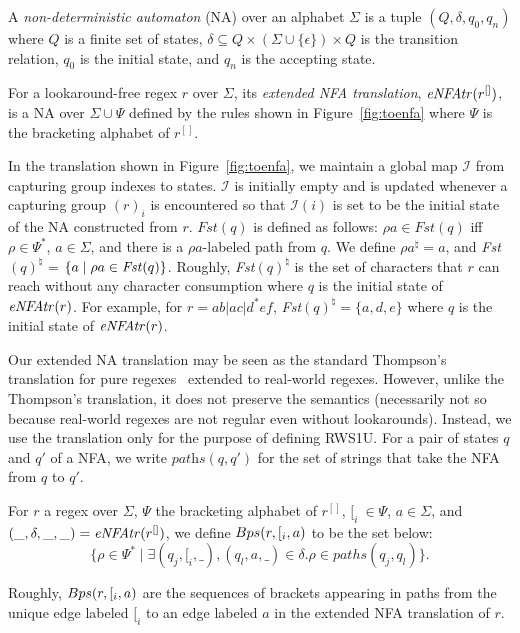 \documentclass[conference]{IEEEtran}
\newcommand{\computePath}{{\sc Bps}}
\newcommand{\follow}{\textit{Fst}}
\newcommand{\Bracketing}{\Psi}
\newcommand{\toENFA}{{\it eNFAtr}}
\newcommand{\ltp}{RWS1U}
\begin{document}
A {\em non-deterministic automaton} ({NA}) over an alphabet $\Sigma$ is a tuple $(Q, \delta, q_0, q_n)$ where $Q$ is a finite set of states, $\delta \subseteq Q \times (\Sigma\cup\{ \epsilon \}) \times Q$ is the transition relation, $q_0$ is the initial state, and $q_n$ is the accepting state. 
\begin{definition}[$\toENFA$]
\label{def:toenfa}
\normalfont
For a lookaround-free regex $r$ over $\Sigma$, its {\em extended NFA translation}, $\toENFA(r^{[]})$, is a {NA} over $\Sigma \cup \Bracketing$ defined by the rules shown in Figure~\ref{fig:toenfa} where $\Bracketing$ is the bracketing alphabet of $r^{[]}$.
\end{definition}
In the translation shown in Figure~\ref{fig:toenfa}, we maintain a global map $\mathcal{I}$ from capturing group indexes to states.  $\mathcal{I}$ is initially empty and is updated whenever a capturing group $(r)_i$ is encountered so that $\mathcal{I}(i)$ is set to be the initial state of the {NA} constructed from $r$.  
$\follow(q)$ is defined as follows: $\rho a \in \follow(q)$ iff $\rho \in \Bracketing^*$, $a \in \Sigma$, and there is a $\rho a$-labeled path from $q$.  We define $\rho a^{\natural} = a$, and \follow$(q)^{\natural}$ = $\{ a \mid \rho a \in \text{\follow}(q) \}$.
Roughly, \follow{}$(q)^{\natural}$ is the set of characters that $r$ can reach without any character consumption where $q$ is the initial state of $\toENFA{}(r)$. For example, for $r = ab|ac|d^*ef$, \follow$(q)^{\natural} = \{ a,d,e \}$ where $q$ is the initial state of $\toENFA{}(r)$.


Our extended {NA} translation may be seen as the standard Thompson's translation for pure regexes~\cite{10.1145/363347.363387,DBLP:books/daglib/0086373} extended to real-world regexes.  However, unlike the Thompson's translation, it does not preserve the semantics (necessarily not so because real-world regexes are not regular even without lookarounds).  Instead, we use the translation only for the purpose of defining \ltp{}.  
For a pair of states $q$ and $q'$ of a NFA, we write
$\textit{paths}(q,q')$ for the set of strings that take the NFA from $q$ to $q'$.
\begin{definition}[$\computePath$]
\normalfont
For $r$ a regex over $\Sigma$,  $\Bracketing$ the bracketing alphabet of $r^{[]}$, $[_i\: \in \Bracketing$, $a \in \Sigma$, and $(\_,\delta,\_,\_) = \toENFA(r^{[]})$, we define $\computePath(r,[_i, a)$ to be the set below:
\[
\{ \rho \in \Bracketing^* \mid \exists (q_j, [_i, \_), (q_l, a, \_) \in \delta. \rho \in paths(q_j,q_l) \}.
\]


\end{definition}
Roughly, $\computePath(r,[_i, a)$ are the sequences of brackets appearing in paths from
the unique edge labeled $[_i$ to an edge labeled $a$ in the extended NFA translation of $r$.
\end{document}
